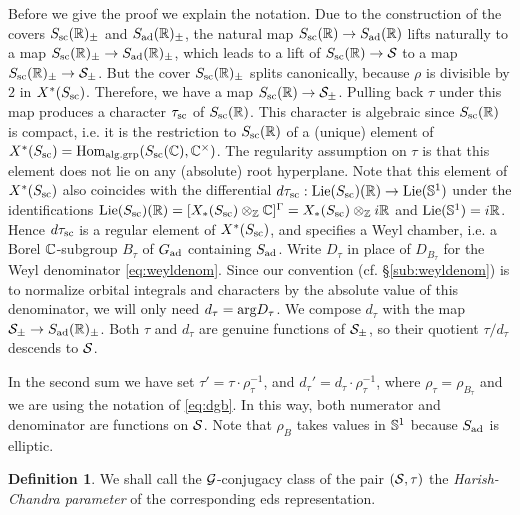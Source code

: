 \documentclass{article}
\theoremstyle{definition}
\newtheorem{dfn}[thm]{Definition}
\numberwithin{equation}{section}
\renewcommand{\-}{\hyp{}}
\begin{document}
Before we give the proof we explain the notation. Due to the construction of the covers $S_{\textrm{sc}}(\mathbb{R})_\pm$ and $S_{\textrm{ad}}(\mathbb{R})_\pm$, the natural map $S_{\textrm{sc}}(\mathbb{R}) \to S_{\textrm{ad}}(\mathbb{R})$ lifts naturally to a map $S_{\textrm{sc}}(\mathbb{R})_\pm \to S_{\textrm{ad}}(\mathbb{R})_\pm$, which leads to a lift of $S_{\textrm{sc}}(\mathbb{R}) \to \mathcal{S}$ to a map $S_{\textrm{sc}}(\mathbb{R})_\pm \to \mathcal{S}_\pm$. But the cover $S_{\textrm{sc}}(\mathbb{R})_\pm$ splits canonically, because $\rho$ is divisible by $2$ in $X^*(S_{\textrm{sc}})$. Therefore, we have a map $S_{\textrm{sc}}(\mathbb{R}) \to \mathcal{S}_\pm$. Pulling back $\tau$ under this map produces a character $\tau_{\textrm{sc}}$ of $S_{\textrm{sc}}(\mathbb{R})$. This character is algebraic since $S_{\textrm{sc}}(\mathbb{R})$ is compact, i.e. it is the restriction to $S_{\textrm{sc}}(\mathbb{R})$ of a (unique) element of  $X^*(S_{\textrm{sc}})=\textrm{Hom}_{\textrm{alg.grp}}(S_{\textrm{sc}}(\mathbb{C}),\mathbb{C}^\times)$. The regularity assumption on $\tau$ is that this element does not lie on any (absolute) root hyperplane. Note that this element of $X^*(S_{\textrm{sc}})$ also coincides with the differential $d\tau_{\textrm{sc}} : \textrm{Lie}(S_{\textrm{sc}})(\mathbb{R}) \to \textrm{Lie}(\mathbb{S}^1)$ under the identifications $\textrm{Lie}(S_{\textrm{sc}})(\mathbb{R})=[X_*(S_{\textrm{sc}}) \otimes_{\mathbb{Z}} \mathbb{C}]^\Gamma = X_*(S_{\textrm{sc}})\otimes_{\mathbb{Z}} i\mathbb{R}$ and $\textrm{Lie}(\mathbb{S}^1)=i\mathbb{R}$. Hence $d\tau_{\textrm{sc}}$ is a regular element of $X^*(S_{\textrm{sc}})$, and specifies a Weyl chamber, i.e. a Borel $\mathbb{C}$-subgroup $B_\tau$ of $G_{\textrm{ad}}$ containing $S_{\textrm{ad}}$. Write $D_\tau$ in place of $D_{B_\tau}$ for the Weyl denominator \eqref{eq:weyldenom}. Since our convention (cf. \S\ref{sub:weyldenom}) is to normalize orbital integrals and characters by the absolute value of this denominator, we will only need $d_\tau=\textrm{arg}D_\tau$. We compose $d_\tau$ with the map $\mathcal{S}_\pm \to S_{\textrm{ad}}(\mathbb{R})_\pm$. Both $\tau$ and $d_\tau$ are genuine functions of $\mathcal{S}_\pm$, so their quotient $\tau/d_\tau$ descends to $\mathcal{S}$.

In the second sum we have set $\tau'=\tau \cdot \rho_\tau^{-1}$, and $d_\tau'=d_\tau \cdot \rho_\tau^{-1}$, where $\rho_\tau=\rho_{B_\tau}$
and we are using the notation of \eqref{eq:dgb}. In this way, both numerator and denominator are functions on $\mathcal{S}$. Note that $\rho_B$ takes values in $\mathbb{S}^1$ because $S_{\textrm{ad}}$ is elliptic.

\begin{dfn} \label{dfn:hcpar}
	We shall call the $\mathcal{G}$-conjugacy class of the pair $(\mathcal{S},\tau)$ the \emph{Harish-Chandra parameter} of the corresponding eds representation.
\end{dfn}
\end{document}
